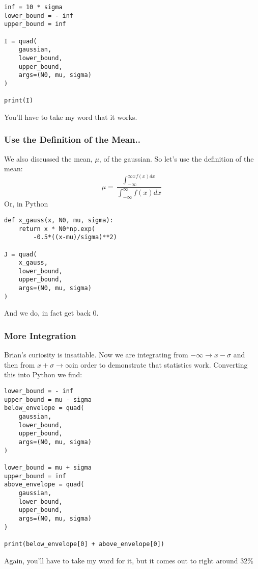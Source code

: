 \documentclass{article}
\begin{document}
\begin{center}
\begin{minipage}[t]{.75\textwidth}
\begin{lstlisting}[frame=tlrb]
inf = 10 * sigma
lower_bound = - inf
upper_bound = inf

I = quad(
    gaussian,
    lower_bound,
    upper_bound,
    args=(N0, mu, sigma)
)

print(I)

\end{lstlisting}
\end{minipage}
\end{center}

You'll have to take my word that it works.

\subsubsection{Use the Definition of the Mean..}
We also discussed the mean, $\mu$, of the gaussian. So let's use the definition
of the mean:
$$\mu = \frac{\int_{-\infty}^{\infty x f(x) dx}}{\int_{-\infty}^{\infty} f(x) dx}$$
Or, in Python

\begin{center}
\begin{minipage}[t]{.75\textwidth}
\begin{lstlisting}[frame=tlrb]
def x_gauss(x, N0, mu, sigma):
    return x * N0*np.exp(
        -0.5*((x-mu)/sigma)**2)

J = quad(
    x_gauss,
    lower_bound,
    upper_bound,
    args=(N0, mu, sigma)
)

\end{lstlisting}
\end{minipage}
\end{center}

And we do, in fact get back 0.

\subsubsection{More Integration}
Brian's curiosity is insatiable. Now we are integrating from $-\infty
\rightarrow x - \sigma$ and then from $x + \sigma \rightarrow \infty $in order to demonstrate that
statistics work. Converting this into Python we find:
\begin{center}
\begin{minipage}[t]{.80\textwidth}
\begin{lstlisting}[frame=tlrb]
lower_bound = - inf
upper_bound = mu - sigma
below_envelope = quad(
    gaussian,
    lower_bound,
    upper_bound,
    args=(N0, mu, sigma)
)

lower_bound = mu + sigma
upper_bound = inf
above_envelope = quad(
    gaussian,
    lower_bound,
    upper_bound,
    args=(N0, mu, sigma)
)

print(below_envelope[0] + above_envelope[0])

\end{lstlisting}
\end{minipage}
\end{center}
Again, you'll have to take my word for it, but it comes out to right around
32\%
\end{document}

